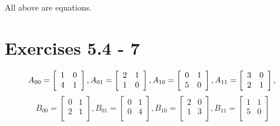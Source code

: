 \documentclass{article}
\begin{document}
All above are equations.

\section{Exercises 5.4 - 7}

\[
A_{00} =
\left[
  \begin{array}{cc}
    1 & 0\\
    4 & 1\\
  \end{array}
\right],
A_{01} =
\left[
  \begin{array}{cc}
    2 & 1\\
    1 & 0\\
  \end{array}
\right],
A_{10} =
\left[
  \begin{array}{cc}
   0  & 1\\
   5  & 0\\
  \end{array}
\right],
A_{11} =
\left[
  \begin{array}{cc}
   3  & 0\\
   2  & 1\\
  \end{array}
\right],\\
\]
\[
B_{00} =
\left[
  \begin{array}{cc}
   0  &1 \\
   2  & 1\\
  \end{array}
\right],
B_{01} =
\left[
  \begin{array}{cc}
   0  & 1\\
   0  & 4\\
  \end{array}
\right],
B_{10} =
\left[
  \begin{array}{cc}
    2 & 0\\
    1 & 3\\
  \end{array}
\right],
B_{11} =
\left[
  \begin{array}{cc}
   1  & 1\\
   5  & 0\\
  \end{array}
\right]
\]
\end{document}
